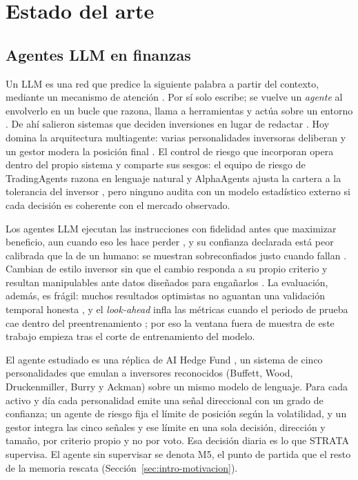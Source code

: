 \chapter{Estado del arte}
\label{cap:estado-arte}

\section{Agentes LLM en finanzas}
\label{sec:agentes-llm}

Un LLM es una red que predice la siguiente palabra a partir del contexto, mediante un mecanismo de atención \cite{vaswani2017attention}. Por sí solo escribe; se vuelve un \emph{agente} al envolverlo en un bucle que razona, llama a herramientas y actúa sobre un entorno \cite{yao2023react, wang2024survey}. De ahí salieron sistemas que deciden inversiones en lugar de redactar \cite{yang2023fingpt}. Hoy domina la arquitectura multiagente: varias personalidades inversoras deliberan y un gestor modera la posición final \cite{xiao2024tradingagents, zhao2025alphaagents}. El control de riesgo que incorporan opera dentro del propio sistema y comparte sus sesgos: el equipo de riesgo de TradingAgents razona en lenguaje natural \cite{xiao2024tradingagents} y AlphaAgents ajusta la cartera a la tolerancia del inversor \cite{zhao2025alphaagents}, pero ninguno audita con un modelo estadístico externo si cada decisión es coherente con el mercado observado.

 Los agentes LLM ejecutan las instrucciones con fidelidad antes que maximizar beneficio, aun cuando eso les hace perder \cite{lopezlira2025cantrade}, y su confianza declarada está peor calibrada que la de un humano: se muestran sobreconfiados justo cuando fallan \cite{sung2025grace, damani2025rlcr}. Cambian de estilo inversor sin que el cambio responda a su propio criterio \cite{li2026behavioral} y resultan manipulables ante datos diseñados para engañarlos \cite{yan2025tradetrap}. La evaluación, además, es frágil: muchos resultados optimistas no aguantan una validación temporal honesta \cite{li2025deepfund}, y el \emph{look-ahead} infla las métricas cuando el periodo de prueba cae dentro del preentrenamiento \cite{benhenda2026lookahead}; por eso la ventana fuera de muestra de este trabajo empieza tras el corte de entrenamiento del modelo.

El agente estudiado es una réplica de AI Hedge Fund \cite{singh2024aihedgefund}, un sistema de cinco personalidades que emulan a inversores reconocidos (Buffett, Wood, Druckenmiller, Burry y Ackman) sobre un mismo modelo de lenguaje. Para cada activo y día cada personalidad emite una señal direccional con un grado de confianza; un agente de riesgo fija el límite de posición según la volatilidad, y un gestor integra las cinco señales y ese límite en una sola decisión, dirección y tamaño, por criterio propio y no por voto. Esa decisión diaria es lo que STRATA supervisa. El agente sin supervisar se denota M5, el punto de partida que el resto de la memoria rescata (Sección~\ref{sec:intro-motivacion}).

